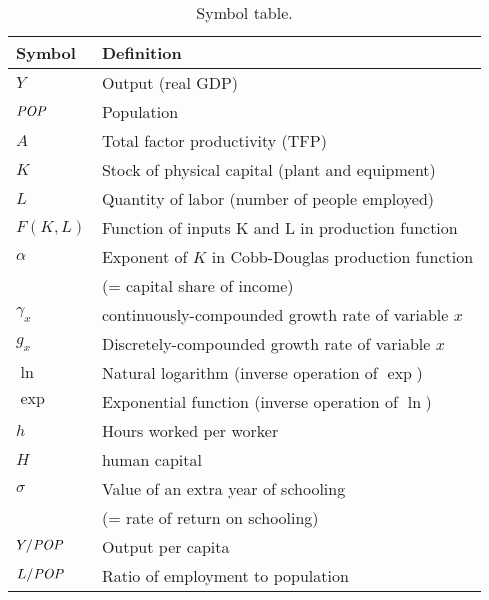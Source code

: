 \begin{table}[H]
\centering
\caption{Symbol table.}
\begin{tabular*}{0.9\textwidth}{l@{\extracolsep{\fill}}l}
\toprule
Symbol & Definition\\
\midrule
$Y$                            &Output (real GDP)\\
$\mbox{\em POP\/}$                      &Population\\
$A$                            &Total factor productivity (TFP)\\
$K$                            &Stock of physical capital (plant and equipment)\\
$L$                            &Quantity of labor (number of people employed)\\
$F(K,L)$                    &Function of inputs K and L in production function\\
$\alpha$                     &Exponent of $K$ in Cobb-Douglas   production function \\
                            &(= capital share of income)\\
$\gamma_x$                  &continuously-compounded growth rate of variable $x$\\
$g_x$                       &Discretely-compounded growth rate of variable $x$\\
$\ln$                        &Natural logarithm (inverse operation of $\exp$)\\
$\exp$                      &Exponential function (inverse operation of $\ln$)\\
$h$                         &Hours worked per worker\\
$H$                         &human capital \\
$\sigma$                     &Value of an extra year of schooling \\
                            &(= rate of return on schooling)\\
$Y/\mbox{\em POP\/}$                        &Output per capita\\
$L/\mbox{\em POP\/}$                        &Ratio of employment to population\\
\bottomrule
\end{tabular*}
\end{table}

